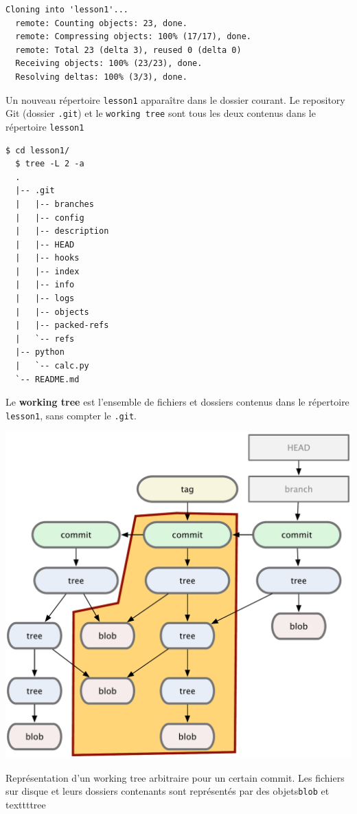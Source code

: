 \documentclass{../../common/tufte-latex/tufte-handout}
\begin{document}
\begin{lstlisting}[style=BashInputStyle]
  Cloning into 'lesson1'...
  remote: Counting objects: 23, done.
  remote: Compressing objects: 100% (17/17), done.
  remote: Total 23 (delta 3), reused 0 (delta 0)
  Receiving objects: 100% (23/23), done.
  Resolving deltas: 100% (3/3), done.
\end{lstlisting}

Un nouveau répertoire \texttt{lesson1} apparaître dans le dossier courant.
Le repository Git (dossier \texttt{.git}) et le \texttt{working tree} sont tous les deux contenus dans le répertoire \texttt{lesson1}

\begin{lstlisting}[style=BashInputStyle]
  $ cd lesson1/
  $ tree -L 2 -a 
  .
  |-- .git
  |   |-- branches
  |   |-- config
  |   |-- description
  |   |-- HEAD
  |   |-- hooks
  |   |-- index
  |   |-- info
  |   |-- logs
  |   |-- objects
  |   |-- packed-refs
  |   `-- refs
  |-- python
  |   `-- calc.py
  `-- README.md
\end{lstlisting}

Le \textbf{working tree} est l'ensemble de fichiers et dossiers contenus dans le répertoire \texttt{lesson1}, sans compter le \texttt{.git}.
\begin{marginfigure}%
  \centering
  \includegraphics[width=\linewidth]{tree.pdf}
  \label{fig:tree}
  \caption{Représentation d'un working tree arbitraire pour un certain commit. Les fichiers sur disque et leurs dossiers contenants sont représentés par des objets\texttt{blob} et texttt{tree}}
\end{marginfigure}
\end{document}
